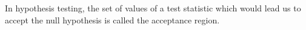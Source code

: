 In hypothesis testing, the set of values of a test statistic which would
lead us to accept the null hypothesis is called the acceptance 
region.